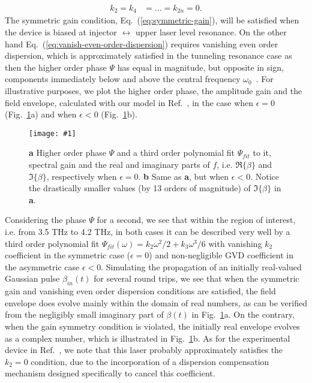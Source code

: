 \documentclass[onecolumn,secnumarabic,amssymb, nobibnotes, aip, prd]{revtex4-1}
\newcommand{\includegraphicsXL}[1]{\texttt{[image: \#1]}}
\begin{document}
\begin{appendices}
\begin{subequations}
\begin{align}
	k_2 = k_4 &= ... = k_{2n}=0. \label{eq:vanish-even-order-dispersion}
	\end{align}
\end{subequations}
The symmetric gain condition, Eq.~(\ref{eq:symmetric-gain}), will be satisfied when the device is biased at injector $\leftrightarrow$ upper laser level resonance. On the other hand Eq.~(\ref{eq:vanish-even-order-dispersion}) requires vanishing even order dispersion, which is approximately satisfied in the tunneling resonance case as then the higher order phase $\Psi$ has equal in magnitude, but opposite in sign, components immediately below and above the central frequency $\omega_0$~\cite{khurgin2005optical}. For illustrative purposes, we plot the higher order phase, the amplitude gain and the field envelope, calculated with our model in Ref.~, in the case when $\epsilon = 0$ (Fig.~\ref{fig:dispersion-on-off-resonance}a) and when $\epsilon < 0$ (Fig.~\ref{fig:dispersion-on-off-resonance}b). 
\begin{figure}[h!]
	\begin{center}
		\includegraphicsXL{IMGS/dispersion-on-off-resonance.eps}
		\caption{ \textbf{a} Higher order phase $\Psi$ and a third order polynomial fit $\Psi_{fit}$ to it, spectral gain  and the real and imaginary parts of $f$, i.e. $\Re\{\beta\}$ and $\Im\{\beta\}$, respectively when $\epsilon = 0$. \textbf{b} Same as \textbf{a}, but when $\epsilon <0$. Notice the drastically smaller values (by 13 orders of magnitude) of $\Im\{\beta\}$ in \textbf{a}. } \label{fig:dispersion-on-off-resonance}
	\end{center}	
\end{figure}
Considering the phase $\Psi$ for a second, we see that within the region of interest, i.e. from 3.5 THz to 4.2 THz, in both cases it can be described very well by a third order polynomial fit $\Psi_{fit}(\omega) = k_2\omega^2/2 + k_3\omega^3/6$ with vanishing $k_2$ coefficient in the symmetric case ($\epsilon = 0$) and non-negligible GVD coefficient in the asymmetric case $\epsilon <0$. Simulating the propagation of an initially real-valued Gaussian pulse $\beta_{in}(t)$ for several round trips, we see that when the symmetric gain and vanishing even order dispersion conditions are satisfied, the field envelope does evolve mainly within the domain of real numbers, as can be verified from the negligibly small imaginary part of $\beta(t)$ in Fig.~\ref{fig:dispersion-on-off-resonance}a. On the contrary, when the gain symmetry condition is violated, the initially real envelope evolves as a complex number, which is illustrated in Fig.~\ref{fig:dispersion-on-off-resonance}b. As for the experimental device in Ref.~, we note that this laser probably approximately satisfies the $k_2 = 0$ condition, due to the incorporation of a dispersion compensation mechanism designed specifically to cancel this coefficient. 


\end{appendices}
\end{document}

